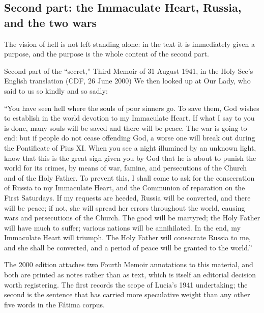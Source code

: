 \subsection{Second part: the Immaculate Heart, Russia, and the two wars}

The vision of hell is not left standing alone: in the text it is
immediately given a purpose, and the purpose is the whole content of
the second part.

\begin{operativetext}{Second part of the ``secret,'' Third Memoir of
31 August 1941, in the Holy See's English translation (CDF, 26 June
2000)}
We then looked up at Our Lady, who said to us so kindly and so sadly:
\par\medskip
``You have seen hell where the souls of poor sinners go. To save them,
God wishes to establish in the world devotion to my Immaculate Heart.
If what I say to you is done, many souls will be saved and there will
be peace. The war is going to end: but if people do not cease
offending God, a worse one will break out during the Pontificate of
Pius XI. When you see a night illumined by an unknown light, know
that this is the great sign given you by God that he is about to
punish the world for its crimes, by means of war, famine, and
persecutions of the Church and of the Holy Father. To prevent this, I
shall come to ask for the consecration of Russia to my Immaculate
Heart, and the Communion of reparation on the First Saturdays. If my
requests are heeded, Russia will be converted, and there will be
peace; if not, she will spread her errors throughout the world,
causing wars and persecutions of the Church. The good will be
martyred; the Holy Father will have much to suffer; various nations
will be annihilated. In the end, my Immaculate Heart will triumph.
The Holy Father will consecrate Russia to me, and she shall be
converted, and a period of peace will be granted to the
world.''
\end{operativetext}

The 2000 edition attaches two Fourth Memoir annotations to this
material, and both are printed as notes rather than as text, which is
itself an editorial decision worth registering. The first records the
scope of Lucia's 1941 undertaking; the second is the sentence that
has carried more speculative weight than any other five words in the
F\'atima corpus.

